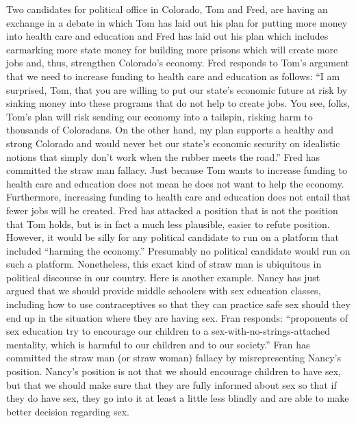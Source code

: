 Two candidates for political office in Colorado, Tom and Fred, are having
an exchange in a debate in which Tom has laid out his plan for putting
more money into health care and education and Fred has laid out his plan
which includes earmarking more state money for building more prisons
which will create more jobs and, thus, strengthen Colorado's economy.
Fred responds to Tom's argument that we need to increase funding to
health care and education as follows: ``I am surprised, Tom, that you are
willing to put our state's economic future at risk by sinking money into
these programs that do not help to create jobs. You see, folks, Tom's
plan will risk sending our economy into a tailspin, risking harm to
thousands of Coloradans. On the other hand, my plan supports a healthy
and strong Colorado and would never bet our state's economic security
on idealistic notions that simply don't work when the rubber meets the
road.''
Fred has committed the straw man fallacy. Just because Tom wants to increase
funding to health care and education does not mean he does not want to help
the economy. Furthermore, increasing funding to health care and education
does not entail that fewer jobs will be created. Fred has attacked a position that
is not the position that Tom holds, but is in fact a much less plausible, easier to
refute position. However, it would be silly for any political candidate to run on a
platform that included ``harming the economy.'' Presumably no political
candidate would run on such a platform. Nonetheless, this exact kind of straw
man is ubiquitous in political discourse in our country.
Here is another example.
Nancy has just argued that we should provide middle schoolers with sex
education classes, including how to use contraceptives so that they can
practice safe sex should they end up in the situation where they are
having sex. Fran responds: ``proponents of sex education try to
encourage our children to a sex-with-no-strings-attached mentality, which
is harmful to our children and to our society.''
Fran has committed the straw man (or straw woman) fallacy by misrepresenting
Nancy's position. Nancy's position is not that we should encourage children to
have sex, but that we should make sure that they are fully informed about sex so
that if they do have sex, they go into it at least a little less blindly and are able to
make better decision regarding sex.

